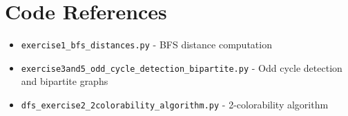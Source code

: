 \documentclass[12pt,a4paper]{article}
\begin{document}
\section{Code References}

\begin{itemize}
    \item \texttt{exercise1\_bfs\_distances.py} - BFS distance computation
    \item \texttt{exercise3and5\_odd\_cycle\_detection\_bipartite.py} - Odd cycle detection and bipartite graphs
    \item \texttt{dfs\_exercise2\_2colorability\_algorithm.py} - 2-colorability algorithm
\end{itemize}
\end{document}
